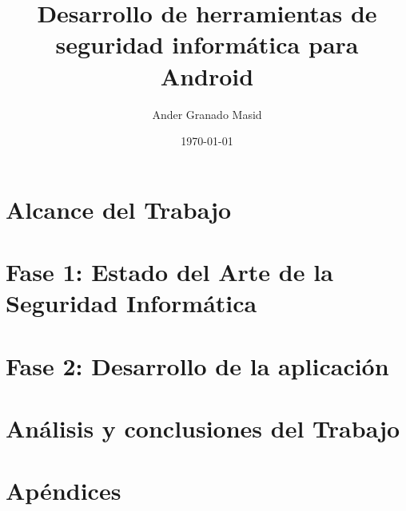 \documentclass[a4paper,11pt,twoside,BCOR=8mm]{scrbook}
\title{Desarrollo de herramientas de seguridad informática para Android}
\author{Ander Granado Masid}
\date{\today}
\begin{document}
\frontmatter





\tableofcontents
\listoffigures
\listoftables
\listoflistings




\mainmatter

\part{Alcance del Trabajo}



\part{Fase 1: Estado del Arte de la Seguridad Informática}






\part{Fase 2: Desarrollo de la aplicación}





\part{Análisis y conclusiones del Trabajo}


\part{Apéndices}


\backmatter

\appendix



\printbibliography[heading=bibintoc]


\end{document}
